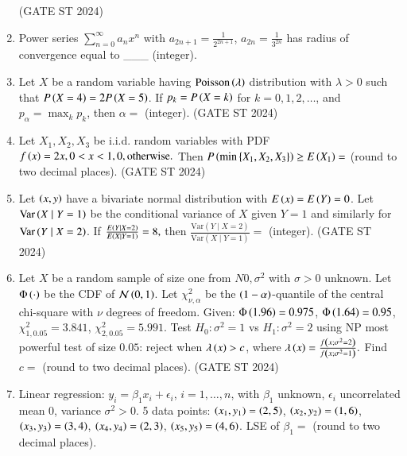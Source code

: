 \documentclass[journal,12pt,onecolumn]{IEEEtran}
\theoremstyle{remark}
\begin{document}
\begin{enumerate}
\begin{enumerate}
\end{enumerate}
\hfill (GATE ST 2024)
\item
Power series $\sum_{n=0}^\infty a_n x^n$ with $a_{2n+1} = \frac{1}{2^{2n+1}}$, $a_{2n} = \frac{1}{3^{2n}}$ has radius of convergence equal to \_\_\_ (integer).
\item
Let $X$ be a random variable having $\mathrm{Poisson}\left(\lambda\right)$ distribution with $\lambda > 0$ such that $P\left(X=4\right) = 2P\left(X=5\right)$.  
If $p_k = P\left(X=k\right)$ for $k = 0,1,2,\dots$, and $p_\alpha = \max_{k} p_k$, then $\alpha =$ \underline{\phantom{imagine}} (integer).
\hfill (GATE ST 2024)
\item
Let $X_1, X_2, X_3$ be i.i.d. random variables with PDF
$
f\left(x\right) = 
2x,  0 < x < 1, \\
0,  \text{otherwise}.
$
Then $P\left(\min\left\{X_1,X_2,X_3\right\}\right) \ge E\left(X_1\right) =$ \underline{\phantom{imagine}} (round to two decimal places).
\hfill (GATE ST 2024)
\item
Let $\left(x,y\right)$ have a bivariate normal distribution with $E\left(x\right)=E\left(Y\right)=0$. Let $\mathrm{Var}\left(X \mid Y=1\right)$ be the conditional variance of $X$ given $Y=1$ and similarly for $\mathrm{Var}\left(Y \mid X=2\right)$.  
If
$
\frac{E\left(Y \mid X=2\right)}{E\left(X \mid Y=1\right)} = 8,
$
then
$
\frac{\mathrm{Var}(Y \mid X=2)}{\mathrm{Var}(X \mid Y=1)} =
$
\underline{\phantom{imagine}} (integer).
\hfill (GATE ST 2024)
\item
Let $X$ be a random sample of size one from $N{0,\sigma^2}$ with $\sigma>0$ unknown. Let $\Phi\left(\cdot\right)$ be the CDF of $\mathcal{N}\left(0,1\right)$. Let $\chi^2_{\nu,\alpha}$ be the $\left(1-\alpha\right)$-quantile of the central chi-square with $\nu$ degrees of freedom.  
Given: $\Phi\left(1.96\right)=0.975$, $\Phi\left(1.64\right)=0.95$, $\chi^2_{1,0.05} = 3.841$, $\chi^2_{2,0.05} = 5.991$.  
Test $H_0: \sigma^2=1$ vs $H_1: \sigma^2=2$ using NP most powerful test of size $0.05$: reject when $\lambda\left(x\right) > c$, where  
$
\lambda\left(x\right) = \frac{f\left(x; \sigma^2=2\right)}{f\left(x; \sigma^2=1\right)}.
$
Find $c =$ \underline{\phantom{imagine}} (round to two decimal places).
\hfill (GATE ST 2024)
\item
Linear regression: $y_i = \beta_1 x_i + \epsilon_i$, $i=1,\dots,n$, with $\beta_1$ unknown, $\epsilon_i$ uncorrelated mean 0, variance $\sigma^2>0$. 5 data points:  
$\left(x_1,y_1\right)=\left(2,5\right)$, $\left(x_2,y_2\right)=\left(1,6\right)$, $\left(x_3,y_3\right)=\left(3,4\right)$, $\left(x_4,y_4\right)=\left(2,3\right)$, $\left(x_5,y_5\right)=\left(4,6\right)$.  
LSE of $\beta_1 =$ \underline{\phantom{imagine}} (round to two decimal places).


\end{enumerate}
\end{document}

